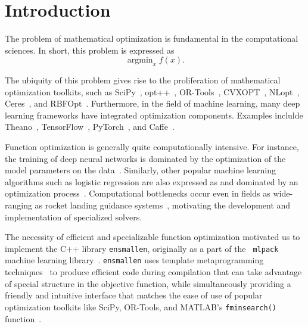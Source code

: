 \section{Introduction}
\label{sec:introduction}

The problem of mathematical optimization is fundamental in the computational
sciences.  In short, this problem is expressed as
%
\begin{equation}
\operatorname{argmin}_x f(x).
\end{equation}

The ubiquity of this problem gives rise to the proliferation of mathematical
optimization toolkits, such as SciPy~\cite{2019arXiv190710121V},
opt++~\cite{meza1994opt++},
OR-Tools~\cite{ortools}, CVXOPT~\cite{vandenberghe2010cvxopt},
NLopt~\cite{johnson2014nlopt}, Ceres~\cite{ceres-solver},
and RBFOpt~\cite{costa2018rbfopt}.
Furthermore, in the field of machine learning, many
deep learning frameworks have integrated optimization
components.  Examples inclulde Theano~\cite{2016arXiv160502688},
TensorFlow~\cite{tensorflow2015-whitepaper}, PyTorch~\cite{NEURIPS2019_9015},
and Caffe~\cite{jia2014caffe}.

Function optimization is generally quite computationally intensive.
For instance, the training of deep neural networks is dominated by
the optimization of the model parameters on the
data~\cite{krizhevsky2012imagenet, lauzon2012introduction}.  Similarly,
other popular machine learning algorithms such as logistic regression are also
expressed as and dominated by an optimization process~\cite{zhang2004solving,
manogaran2018health}.  Computational bottlenecks occur even in fields as
wide-ranging as rocket landing guidance systems~\cite{dueri2016customized},
motivating the development and implementation of specialized solvers.

The necessity of efficient and specializable function optimization motivated us
to implement the C++ library {\tt ensmallen}, originally as a part of the {\tt
mlpack} machine learning library~\cite{mlpack2018}.  {\tt ensmallen} uses
template metaprogramming techniques~\cite{veldhuizen1998c++,
alexandrescu2001modern, abrahams2004c++} to produce efficient code during
compilation that can take advantage of special structure in the objective
function, while simultaneously providing a friendly and intuitive interface
that matches the ease of use of popular optimization toolkits like SciPy,
OR-Tools, and MATLAB's {\tt fminsearch()} function~\cite{matlab_fminsearch}.

